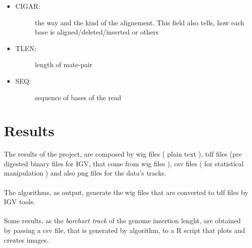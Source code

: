 \begin{itemize}
\item \begin{description}
		\item[CIGAR:] the way and the kind of the alignement. This field also tells, how each base is aligned/deleted/inserted or others
  \end{description}
\end{itemize}
\begin{itemize}
\item \begin{description}
		\item[TLEN:] length of mate-pair
		  \end{description}
\end{itemize}
\begin{itemize}
\item \begin{description}
		\item[SEQ:] sequence of bases of the read
  \end{description}
\end{itemize}


\section{Results}

The results of the project, are composed by wig files ( plain text ), tdf files (pre digested binary files for IGV, that come from wig files ), csv files ( for statistical manipulation ) and also png files for the data's tracks.\\\\

The algorithms, as output, generate the wig files that are converted to tdf files by IGV tools.\\\\

Some results, as the \emph{barchart track} of the genome insertion lenght, are obtained by passing a csv file, that is generated by algorithm, to a R script that plots and creates images.